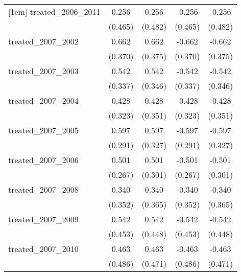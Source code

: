 {\begin{tabular}{l*{4}{c}}
[1em]
treated\_2006\_2011&       0.256         &       0.256         &      -0.256         &      -0.256         \\
            &     (0.465)         &     (0.482)         &     (0.465)         &     (0.482)         \\
[1em]
treated\_2007\_2002&       0.662         &       0.662         &      -0.662         &      -0.662         \\
            &     (0.370)         &     (0.375)         &     (0.370)         &     (0.375)         \\
[1em]
treated\_2007\_2003&       0.542         &       0.542         &      -0.542         &      -0.542         \\
            &     (0.337)         &     (0.346)         &     (0.337)         &     (0.346)         \\
[1em]
treated\_2007\_2004&       0.428         &       0.428         &      -0.428         &      -0.428         \\
            &     (0.323)         &     (0.351)         &     (0.323)         &     (0.351)         \\
[1em]
treated\_2007\_2005&       0.597\sym{*}  &       0.597         &      -0.597\sym{*}  &      -0.597         \\
            &     (0.291)         &     (0.327)         &     (0.291)         &     (0.327)         \\
[1em]
treated\_2007\_2006&       0.501         &       0.501         &      -0.501         &      -0.501         \\
            &     (0.267)         &     (0.301)         &     (0.267)         &     (0.301)         \\
[1em]
treated\_2007\_2008&       0.340         &       0.340         &      -0.340         &      -0.340         \\
            &     (0.352)         &     (0.365)         &     (0.352)         &     (0.365)         \\
[1em]
treated\_2007\_2009&       0.542         &       0.542         &      -0.542         &      -0.542         \\
            &     (0.453)         &     (0.448)         &     (0.453)         &     (0.448)         \\
[1em]
treated\_2007\_2010&       0.463         &       0.463         &      -0.463         &      -0.463         \\
            &     (0.486)         &     (0.471)         &     (0.486)         &     (0.471)         \\

\end{tabular}}
